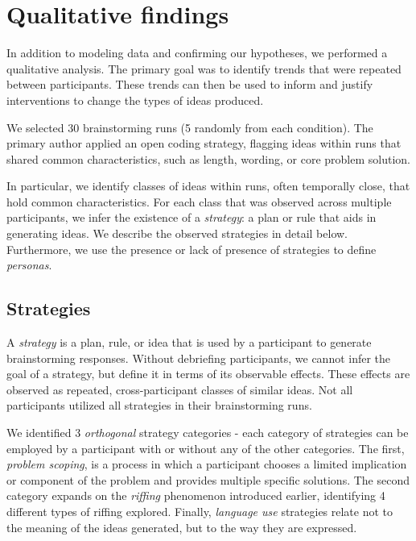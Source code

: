 \section{Qualitative findings}

In addition to modeling data and confirming our hypotheses, we performed a qualitative analysis. The primary goal was to identify trends  that were repeated between participants. These trends can then be used to inform and justify interventions to change the types of ideas produced.

We selected 30 brainstorming runs (5 randomly from each condition). The primary author applied an open coding strategy, flagging ideas within runs that shared common characteristics, such as length, wording, or core problem solution.

In particular, we identify classes of ideas within runs, often temporally close, that hold common characteristics. For each class that was observed across multiple participants, we infer the existence of a \emph{strategy}: a plan or rule that aids in generating ideas. We describe the observed strategies in detail below.
Furthermore, we use the presence or lack of presence of strategies to define \emph{personas}.

\subsection{Strategies}

A \emph{strategy} is a plan, rule, or idea that is used by a participant to generate brainstorming responses.
Without debriefing participants, we cannot infer the goal of a strategy, but define it in terms of its observable effects.
These effects are observed as repeated, cross-participant classes of similar ideas.
Not all participants utilized all strategies in their brainstorming runs.

We identified 3 \emph{orthogonal} strategy categories - each category of strategies can be employed by a participant with or without any of the other categories.
The first, \emph{problem scoping}, is a process in which a participant chooses a limited implication or component of the problem and provides multiple specific solutions.
The second category expands on the \emph{riffing} phenomenon introduced earlier, identifying 4 different types of riffing explored.
Finally, \emph{language use} strategies relate not to the meaning of the ideas generated, but to the way they are expressed.

